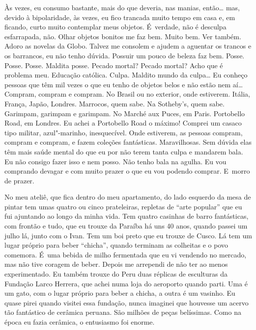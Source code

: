Às vezes, eu consumo bastante, mais do que deveria, nas manias,
então… mas, devido à bipolaridade, às vezes, eu fico trancada
muito tempo em casa e, em ficando, curto muito contemplar meus objetos.
É~verdade, não é desculpa esfarrapada, não. Olhar objetos bonitos me faz
bem. Muito bem. Ver  também. Adoro as novelas da Globo. Talvez me
consolem e ajudem a aguentar os trancos e os barrancos, eu não tenho
dúvida. Possuir um pouco de beleza faz bem. Posse. Posse. Posse. Maldita
posse. Pecado mortal? Pecado mortal? Acho que é problema meu. Educação
católica. Culpa. Maldito mundo da culpa… Eu conheço pessoas que
têm mil vezes o que eu tenho de objetos belos e não estão nem aí…
Compram, compram e compram. No Brasil ou no exterior, onde estiverem.
Itália, França, Japão, Londres. Marrocos, quem sabe. Na Sotheby's, quem
sabe. Garimpam, garimpam e garimpam. No Marché aux Puces, em Paris.
Portobello Road, em Londres. Eu achei a Portobello Road o máximo!
Comprei um casaco tipo militar, azul"-marinho, inesquecível. Onde
estiverem, as pessoas compram, compram e compram, e fazem coleções
fantásticas. Maravilhosas. Sem dúvida elas têm mais saúde mental do que
eu por não terem tanta culpa e mandarem bala. Eu não consigo fazer isso
e nem posso. Não tenho bala na agulha. Eu vou comprando devagar e com
muito prazer o que eu vou podendo comprar. E~morro de prazer.

No meu ateliê, que fica dentro do meu apartamento, do lado esquerdo da
mesa de pintar tem umas quatro ou cinco prateleiras, repletas de ``arte
popular'' que eu fui ajuntando ao longo da minha vida. Tem quatro
casinhas de barro fantásticas, com frontão e tudo, que eu trouxe da
Paraíba há uns 40 anos, quando passei um julho lá, junto com o Ivan. Tem
um boi preto que eu trouxe de Cusco. Lá tem um lugar próprio para beber
``chicha'', quando terminam as colheitas e o povo comemora. É~uma bebida
de milho fermentada que eu vi vendendo no mercado, mas não tive coragem
de beber. Depois me arrependi de não ter ao menos experimentado. Eu
também trouxe do Peru duas réplicas de esculturas da Fundação Larco
Herrera, que achei numa loja do aeroporto quando parti. Uma é um gato,
com o lugar próprio para beber a chicha, a outra é um vasinho. Eu quase
pirei quando visitei essa fundação, nunca imaginei que houvesse um
acervo tão fantástico de cerâmica peruana. São milhões de peças
belíssimas. Como na época eu fazia cerâmica, o entusiasmo foi enorme.

